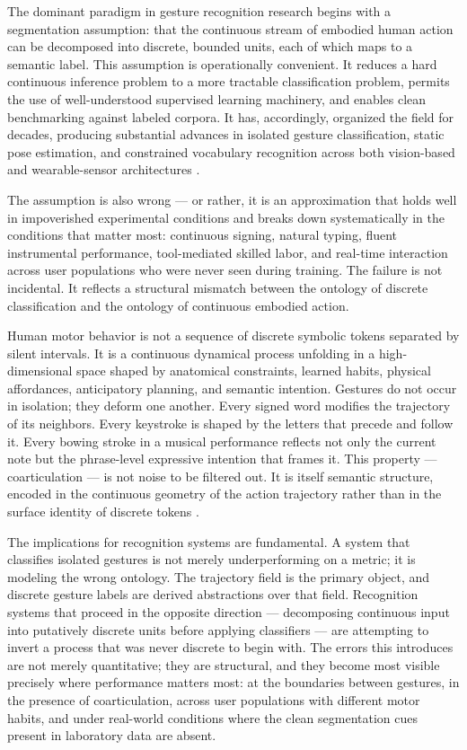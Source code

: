 \documentclass[11pt, a4paper]{article}
\theoremstyle{definition}
\begin{document}
The dominant paradigm in gesture recognition research begins with a segmentation assumption: that the continuous stream of embodied human action can be decomposed into discrete, bounded units, each of which maps to a semantic label. This assumption is operationally convenient. It reduces a hard continuous inference problem to a more tractable classification problem, permits the use of well-understood supervised learning machinery, and enables clean benchmarking against labeled corpora. It has, accordingly, organized the field for decades, producing substantial advances in isolated gesture classification, static pose estimation, and constrained vocabulary recognition across both vision-based and wearable-sensor architectures \cite{sharma2021,sarma2021,kudrinko2021}.

The assumption is also wrong --- or rather, it is an approximation that holds well in impoverished experimental conditions and breaks down systematically in the conditions that matter most: continuous signing, natural typing, fluent instrumental performance, tool-mediated skilled labor, and real-time interaction across user populations who were never seen during training. The failure is not incidental. It reflects a structural mismatch between the ontology of discrete classification and the ontology of continuous embodied action.

Human motor behavior is not a sequence of discrete symbolic tokens separated by silent intervals. It is a continuous dynamical process unfolding in a high-dimensional space shaped by anatomical constraints, learned habits, physical affordances, anticipatory planning, and semantic intention. Gestures do not occur in isolation; they deform one another. Every signed word modifies the trajectory of its neighbors. Every keystroke is shaped by the letters that precede and follow it. Every bowing stroke in a musical performance reflects not only the current note but the phrase-level expressive intention that frames it. This property --- coarticulation --- is not noise to be filtered out. It is itself semantic structure, encoded in the continuous geometry of the action trajectory rather than in the surface identity of discrete tokens \cite{cox2016}.

The implications for recognition systems are fundamental. A system that classifies isolated gestures is not merely underperforming on a metric; it is modeling the wrong ontology. The trajectory field is the primary object, and discrete gesture labels are derived abstractions over that field. Recognition systems that proceed in the opposite direction --- decomposing continuous input into putatively discrete units before applying classifiers --- are attempting to invert a process that was never discrete to begin with. The errors this introduces are not merely quantitative; they are structural, and they become most visible precisely where performance matters most: at the boundaries between gestures, in the presence of coarticulation, across user populations with different motor habits, and under real-world conditions where the clean segmentation cues present in laboratory data are absent.
\end{document}
